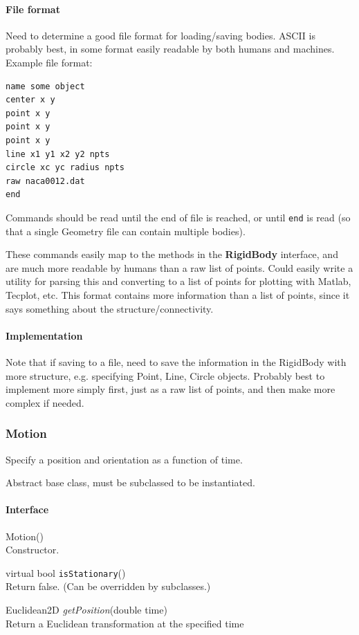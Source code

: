 \documentclass[11pt]{article}
\def\class#1{{\bf #1}} %
\def\fn#1{{\tt #1}} %
\def\virtualfn#1{{\it #1}} %
\begin{document}
\paragraph{File format}
Need to determine a good file format for loading/saving bodies.  ASCII is probably best, in some format easily readable by both humans and machines.  Example file format:
\begin{verbatim}
name some object
center x y
point x y
point x y
point x y
line x1 y1 x2 y2 npts
circle xc yc radius npts
raw naca0012.dat
end
\end{verbatim}
Commands should be read until the end of file is reached, or until {\tt end} is read (so that a single Geometry file can contain multiple bodies).

These commands easily map to the methods in the \class{RigidBody} interface, and are much more readable by humans than a raw list of points.  Could easily write a utility for parsing this and converting to a list of points for plotting with Matlab, Tecplot, etc.  This format contains more information than a list of points, since it says something about the structure/connectivity.

\paragraph{Implementation}
Note that if saving to a file, need to save the information in the RigidBody with more structure, e.g. specifying Point, Line, Circle objects.  Probably best to implement more simply first, just as a raw list of points, and then make more complex if needed.

\subsubsection{Motion}
Specify a position and orientation as a function of time.

Abstract base class, must be subclassed to be instantiated.

\paragraph{Interface}
\begin{description}
	\item Motion() \\
		Constructor.
	\item virtual bool \fn{isStationary}() \\
		Return false.  (Can be overridden by subclasses.)
	\item Euclidean2D \virtualfn{getPosition}(double time) \\
		Return a Euclidean transformation at the specified time
\end{description}
\end{document}
